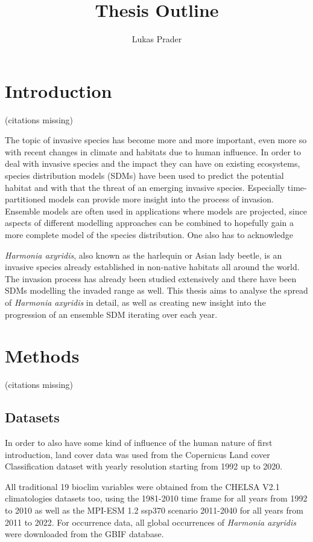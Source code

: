 \documentclass[12pt, english]{article}
\begin{document}
\title{Thesis Outline}
\author{Lukas Prader}
\date{}
\maketitle

\section{Introduction}
(citations missing)

The topic of invasive species has become more and more important, even more so with recent changes in climate and habitats due to human influence.
In order to deal with invasive species and the impact they can have on existing ecosystems, species distribution models (SDMs) have been used to predict the potential habitat and with that the threat of an emerging invasive species.
Especially time-partitioned models can provide more insight into the process of invasion. Ensemble models are often used in applications where models are projected, since aspects of different modelling approaches can be combined to hopefully gain a more complete model of the species distribution. One also has to acknowledge 

\textit{Harmonia axyridis}, also known as the harlequin or Asian lady beetle, is an invasive species already established in non-native habitats all around the world.
The invasion process has already been studied extensively and there have been SDMs modelling the invaded range as well. 
This thesis aims to analyse the spread of \textit{Harmonia axyridis} in detail, as well as creating new insight into the progression of an ensemble SDM iterating over each year. 

\newpage
\section{Methods}
(citations missing)
\subsection{Datasets}
In order to also have some kind of influence of the human nature of first introduction, land cover data was used from the Copernicus Land cover Classification dataset with yearly resolution starting from 1992 up to 2020.

All traditional 19 bioclim variables were obtained from the CHELSA V2.1 climatologies datasets too, using the 1981-2010 time frame for all years from 1992 to 2010 as well as the MPI-ESM 1.2 ssp370 scenario 2011-2040 for all years from 2011 to 2022. 
For occurrence data, all global occurrences of \textit{Harmonia axyridis} were downloaded from the GBIF database.
\end{document}
